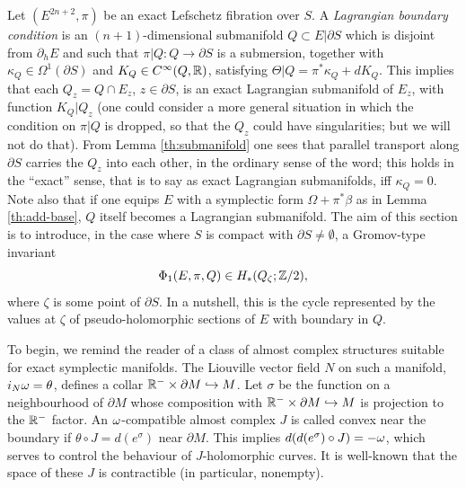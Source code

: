 \documentclass[10pt,letterpaper]{article}
\begin{document}
Let $(E^{2n+2},\pi)$ be an exact Lefschetz fibration over $S$. A {\em
Lagrangian boundary condition} is an $(n+1)$-dimensional submanifold $Q \subset
E|\partial S$ which is disjoint from $\partial_hE$ and such that $\pi|Q: Q
\rightarrow \partial S$ is a submersion, together with $\kappa_Q \in
\Omega^1(\partial S)$ and $K_Q \in C^\infty(Q,\mathbb{R})$, satisfying $\Theta|Q =
\pi^*\kappa_Q + dK_Q$. This implies that each $Q_z = Q \cap E_z$, $z \in
\partial S$, is an exact Lagrangian submanifold of $E_z$, with function
$K_Q|Q_z$ (one could consider a more general situation in which the condition
on $\pi|Q$ is dropped, so that the $Q_z$ could have singularities; but we will
not do that). From Lemma \ref{th:submanifold} one sees that parallel transport
along $\partial S$ carries the $Q_z$ into each other, in the ordinary sense of
the word; this holds in the ``exact'' sense, that is to say as exact Lagrangian
submanifolds, iff $\kappa_Q = 0$. Note also that if one equips $E$ with a
symplectic form $\Omega + \pi^*\beta$ as in Lemma \ref{th:add-base}, $Q$ itself
becomes a Lagrangian submanifold. The aim of this section is to introduce, in
the case where $S$ is compact with $\partial S \neq \emptyset$, a Gromov-type
invariant
\[
\Phi_1(E,\pi,Q) \in H_*(Q_\zeta;\mathbb{Z}/2),
\]
where $\zeta$ is some point of $\partial S$. In a nutshell, this is the cycle
represented by the values at $\zeta$ of pseudo-holomorphic sections of $E$ with
boundary in $Q$.

To begin, we remind the reader of a class of almost complex structures suitable
for exact symplectic manifolds. The Liouville vector field $N$ on such a
manifold, $i_N\omega = \theta$, defines a collar $\mathbb{R}^- \times \partial M
\hookrightarrow M$. Let $\sigma$ be the function on a neighbourhood of
$\partial M$ whose composition with $\mathbb{R}^- \times \partial M \hookrightarrow M$
is projection to the $\mathbb{R}^-$ factor. An $\omega$-compatible almost complex $J$ is
called convex near the boundary if $\theta \circ J = d(e^\sigma)$ near
$\partial M$. This implies $d(d(e^\sigma) \circ J) = -\omega$, which serves to
control the behaviour of $J$-holomorphic curves. It is well-known that the
space of these $J$ is contractible (in particular, nonempty).
\end{document}
